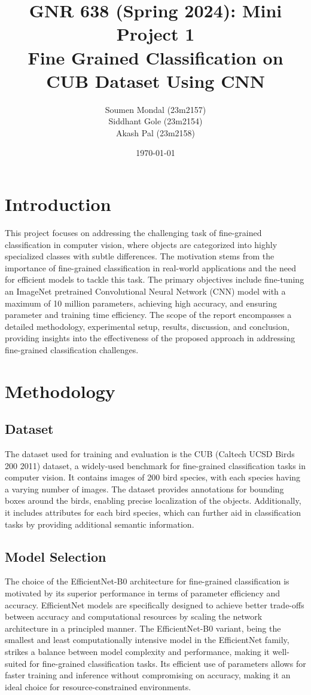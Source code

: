 \documentclass[12pt, a4paper, twoside]{article}
\title{\vspace{-0.5in}\textbf{GNR 638 (Spring 2024): Mini Project 1\\{\large Fine Grained Classification on CUB Dataset Using CNN}}}
\author{Soumen Mondal (23m2157)\\Siddhant Gole (23m2154)\\Akash Pal (23m2158)}
\date{\today}
\begin{document}
	\maketitle
	\thispagestyle{fancy}
	
	\section{Introduction}
		This project focuses on addressing the challenging task of fine-grained classification in computer vision, where objects are categorized into highly specialized classes with subtle differences. The motivation stems from the importance of fine-grained classification in real-world applications and the need for efficient models to tackle this task. The primary objectives include fine-tuning an ImageNet pretrained Convolutional Neural Network (CNN) model with a maximum of 10 million parameters, achieving high accuracy, and ensuring parameter and training time efficiency. The scope of the report encompasses a detailed methodology, experimental setup, results, discussion, and conclusion, providing insights into the effectiveness of the proposed approach in addressing fine-grained classification challenges.
		
	\section{Methodology}
		\subsection{Dataset}
			The dataset used for training and evaluation is the CUB (Caltech UCSD Birds 200 2011) dataset\cite{cub}, a widely-used benchmark for fine-grained classification tasks in computer vision. It contains images of 200 bird species, with each species having a varying number of images. The dataset provides annotations for bounding boxes around the birds, enabling precise localization of the objects. Additionally, it includes attributes for each bird species, which can further aid in classification tasks by providing additional semantic information.
		
		\subsection{Model Selection}
			The choice of the EfficientNet-B0 architecture for fine-grained classification is motivated by its superior performance in terms of parameter efficiency and accuracy. EfficientNet models are specifically designed to achieve better trade-offs between accuracy and computational resources by scaling the network architecture in a principled manner. The EfficientNet-B0 variant, being the smallest and least computationally intensive model in the EfficientNet family, strikes a balance between model complexity and performance, making it well-suited for fine-grained classification tasks. Its efficient use of parameters allows for faster training and inference without compromising on accuracy, making it an ideal choice for resource-constrained environments.
			
\end{document}
